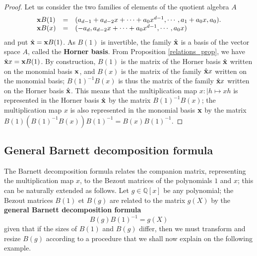 \documentclass{standalone}
\begin{document}
\begin{proof}
Let us consider the two families of elements of the quotient algebra $A$
\begin{equation}
	\begin{array}{lll}
		\bold{x}B(1) & = & (a_{d-1} + a_{d-2}x + \cdots + a_0x^{d-1}, \cdots, a_1 + a_0x,  a_0).\\
		\bold{x}B(x) & = & (-a_d, a_{d-2}x + \cdots + a_0x^{d-1}, \cdots, a_0x)
	\end{array}
\end{equation}
and put $\hat{\bold{x}} = \bold{x}B(1)$.
As $B(1)$ is invertible, the family $\hat{\bold{x}}$ is a basis of the vector space $A$, called the {\bf Horner basis}.
From Proposition \ref{relations_prop}, we have $\hat{\bold{x}}x = \bold{x}B(1)$. 
By construction, $B(1)$ is the matrix of the Horner basis $\hat{\bold{x}}$ written on the monomial basis $\bold{x}$, and $B(x)$ is the matrix of the family $\hat{\bold{x}}x$ written on the monomial basis;
$B(1)^{-1}B(x)$ is thus the matrix of the family $\hat{\bold{x}}x$ written on the Horner basis $\hat{\bold{x}}$. 
This means that the multiplication map $x : \left\vert h \mapsto xh\right.$ is represented in the Horner basis $\hat{\bold{x}}$ by the matrix $B(1)^{-1}B(x)$;
the multiplication map $x$ is also represented in the monomial basis $\bold{x}$ by the matrix $B(1)(B(1)^{-1}B(x))B(1)^{-1} = B(x)B(1)^{-1}$.
\end{proof}

\subsection{General Barnett decomposition formula}
\label{Bar_gen}
The Barnett decomposition formula relates the companion matrix, representing the multiplication map $x$, to the Bezout matrices of the polynomials $1$ and $x$;
this can be naturally extended as follows.
Let $g \in \mathbb{Q}[x]$ be any polynomial;
the Bezout matrices $B(1)$ et $B(g)$ are related to the matrix $g(X)$ by the {\bf general Barnett decomposition formula}
\begin{equation}
	\label{GBG}
	B(g)B(1)^{-1} = g(X)
\end{equation}
given that if the sizes of $B(1)$ and $B(g)$ differ, then we must transform and resize $B(g)$ according to a procedure that we shall now explain on the following example.
\end{document}
